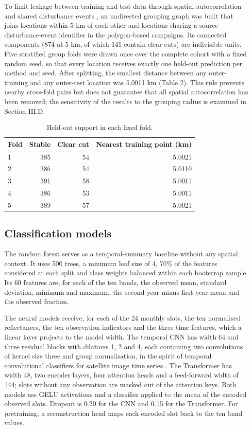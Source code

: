 \documentclass[10pt,a4paper,twocolumn]{article}
\begin{document}
To limit leakage between training and test data through spatial autocorrelation and shared disturbance events \cite{ref4,ref21}, an undirected grouping graph was built that joins locations within 5 km of each other and locations sharing a source disturbance-event identifier in the polygon-based campaigns. Its connected components (874 at 5 km, of which 141 contain clear cuts) are indivisible units. Five stratified group folds were drawn once over the complete cohort with a fixed random seed, so that every location receives exactly one held-out prediction per method and seed. After splitting, the smallest distance between any outer-training and any outer-test location was 5.0011 km (Table 2). This rule prevents nearby cross-fold pairs but does not guarantee that all spatial autocorrelation has been removed; the sensitivity of the results to the grouping radius is examined in Section III.D.

\begin{table}[tbp]
\centering
\small
\caption{Held-out support in each fixed fold.}
\begin{tabular}{lrrr}
\toprule
Fold & Stable & Clear cut & Nearest training point (km) \\ \midrule
1 & 385 & 54 & 5.0021 \\
2 & 386 & 54 & 5.0110 \\
3 & 391 & 58 & 5.0011 \\
4 & 386 & 53 & 5.0011 \\
5 & 389 & 57 & 5.0021 \\
\bottomrule
\end{tabular}
\end{table}

\subsection{Classification models}
The random forest \cite{ref5} serves as a temporal-summary baseline without any spatial context. It uses 500 trees, a minimum leaf size of 4, 70\% of the features considered at each split and class weights balanced within each bootstrap sample. Its 60 features are, for each of the ten bands, the observed mean, standard deviation, minimum and maximum, the second-year minus first-year mean and the observed fraction.

The neural models receive, for each of the 24 monthly slots, the ten normalised reflectances, the ten observation indicators and the three time features, which a linear layer projects to the model width. The temporal CNN has width 64 and three residual blocks with dilations 1, 2 and 4, each containing two convolutions of kernel size three and group normalisation, in the spirit of temporal convolutional classifiers for satellite image time series \cite{ref11}. The Transformer has width 48, two encoder layers, four attention heads and a feed-forward width of 144; slots without any observation are masked out of the attention keys. Both models use GELU activations and a classifier applied to the mean of the encoded observed slots. Dropout is 0.20 for the CNN and 0.15 for the Transformer. For pretraining, a reconstruction head maps each encoded slot back to the ten band values.
\end{document}
